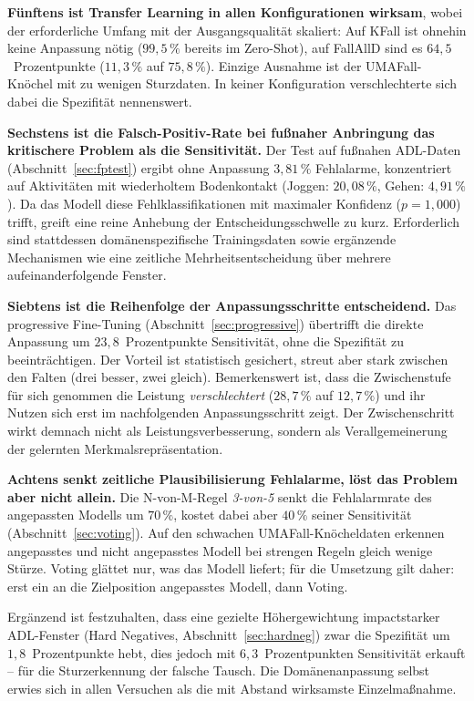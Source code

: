\documentclass[11pt,a4paper,oneside]{report}
\begin{document}
\textbf{Fünftens ist Transfer Learning in allen Konfigurationen
wirksam}, wobei der erforderliche Umfang mit der Ausgangsqualität
skaliert: Auf KFall ist ohnehin keine Anpassung nötig
($99{,}5\,\%$ bereits im Zero-Shot), auf FallAllD sind es
$64{,}5$~Prozentpunkte ($11{,}3\,\%$ auf $75{,}8\,\%$). Einzige
Ausnahme ist der UMAFall-Knöchel mit zu wenigen Sturzdaten. In keiner
Konfiguration verschlechterte sich dabei die Spezifität nennenswert.

\textbf{Sechstens ist die Falsch-Positiv-Rate bei fußnaher Anbringung
das kritischere Problem als die Sensitivität.} Der Test auf
fußnahen ADL-Daten (Abschnitt~\ref{sec:fptest}) ergibt ohne Anpassung
$3{,}81\,\%$ Fehlalarme, konzentriert auf Aktivitäten mit
wiederholtem Bodenkontakt (Joggen: $20{,}08\,\%$, Gehen:
$4{,}91\,\%$). Da das Modell diese Fehlklassifikationen mit maximaler
Konfidenz ($p = 1{,}000$) trifft, greift eine reine Anhebung der
Entscheidungsschwelle zu kurz. Erforderlich sind stattdessen
domänenspezifische Trainingsdaten sowie ergänzende Mechanismen wie
eine zeitliche Mehrheitsentscheidung über mehrere aufeinanderfolgende
Fenster.

\textbf{Siebtens ist die Reihenfolge der Anpassungsschritte
entscheidend.} Das progressive Fine-Tuning
(Abschnitt~\ref{sec:progressive}) übertrifft die direkte Anpassung um
$23{,}8$~Prozentpunkte Sensitivität, ohne die Spezifität zu
beeinträchtigen. Der Vorteil ist statistisch gesichert, streut aber
stark zwischen den Falten (drei besser, zwei gleich). Bemerkenswert
ist, dass die Zwischenstufe für sich genommen die Leistung
\emph{verschlechtert} ($28{,}7\,\%$ auf $12{,}7\,\%$) und ihr Nutzen
sich erst im nachfolgenden Anpassungsschritt zeigt. Der
Zwischenschritt wirkt demnach nicht als Leistungsverbesserung,
sondern als Verallgemeinerung der gelernten
Merkmalsrepräsentation.

\textbf{Achtens senkt zeitliche Plausibilisierung Fehlalarme, löst
das Problem aber nicht allein.} Die N-von-M-Regel \emph{3-von-5}
senkt die Fehlalarmrate des angepassten Modells um $70\,\%$, kostet
dabei aber $40\,\%$ seiner Sensitivität (Abschnitt~\ref{sec:voting}).
Auf den schwachen UMAFall-Knöcheldaten erkennen angepasstes und nicht
angepasstes Modell bei strengen Regeln gleich wenige Stürze. Voting
glättet nur, was das Modell liefert; für die Umsetzung gilt daher:
erst ein an die Zielposition angepasstes Modell, dann Voting.

Ergänzend ist festzuhalten, dass eine gezielte Höhergewichtung
impactstarker ADL-Fenster (Hard Negatives,
Abschnitt~\ref{sec:hardneg}) zwar die Spezifität um
$1{,}8$~Prozentpunkte hebt, dies jedoch mit $6{,}3$~Prozentpunkten
Sensitivität erkauft -- für die Sturzerkennung der falsche Tausch.
Die Domänenanpassung selbst erwies sich in allen Versuchen als die
mit Abstand wirksamste Einzelmaßnahme.
\end{document}
